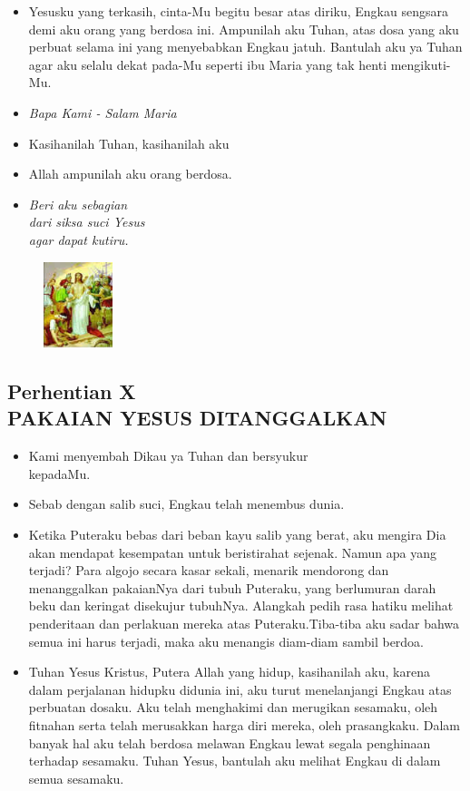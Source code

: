 \documentclass[a5paper,headsepline,titlepage,10pt,nnormalheadings,DIVcalc]{scrbook}
\newcommand{\BU}[1]{\begin{itemize} \item[U:] #1 \end{itemize}}
\newcommand{\BP}[1]{\begin{itemize} \item[P:] #1 \end{itemize}}
\begin{document}
\BU{Yesusku yang terkasih, cinta-Mu begitu besar atas diriku, Engkau sengsara demi aku orang  yang berdosa ini. Ampunilah aku Tuhan, atas dosa yang aku perbuat selama ini yang menyebabkan Engkau jatuh. Bantulah aku ya Tuhan agar aku selalu dekat pada-Mu seperti ibu Maria yang tak henti mengikuti-Mu.}

\large\begin{itemize}\item[~]\it{Bapa Kami - Salam Maria}\end{itemize}\normalsize
\BP{Kasihanilah Tuhan, kasihanilah aku}
   \BU{Allah ampunilah aku orang berdosa.}

\begin{itemize}
\item[9.] \it{Beri aku sebagian\\ dari siksa suci Yesus\\
    agar dapat kutiru.
}\end{itemize}

\begin{figure}
\includegraphics[width=2cm]{jalansalib_files/10_small.jpg}
\end{figure}
\subsection*{Perhentian X\\
PAKAIAN YESUS DITANGGALKAN}

\BP{   Kami menyembah Dikau ya Tuhan dan bersyukur\\kepadaMu.}
\BU{   Sebab dengan salib suci, Engkau telah menembus dunia.}

\BP{Ketika Puteraku bebas  dari  beban  kayu  salib yang berat, aku mengira Dia akan mendapat kesempatan untuk beristirahat sejenak. Namun apa yang terjadi? Para algojo secara kasar sekali, menarik mendorong dan menanggalkan pakaianNya dari tubuh Puteraku, yang berlumuran darah beku dan keringat disekujur tubuhNya. Alangkah pedih rasa hatiku melihat penderitaan dan perlakuan mereka atas Puteraku.Tiba-tiba aku sadar bahwa semua ini harus terjadi, maka aku menangis diam-diam sambil berdoa.}

\BU{ Tuhan Yesus Kristus, Putera Allah  yang  hidup,  kasihanilah  aku,  karena dalam perjalanan hidupku didunia ini, aku turut menelanjangi Engkau atas perbuatan dosaku. Aku telah menghakimi dan merugikan sesamaku, oleh fitnahan serta  telah merusakkan harga diri mereka, oleh prasangkaku. Dalam banyak hal aku telah berdosa melawan Engkau lewat segala penghinaan terhadap sesamaku. Tuhan Yesus, bantulah aku melihat Engkau di dalam semua sesamaku.}
\end{document}
